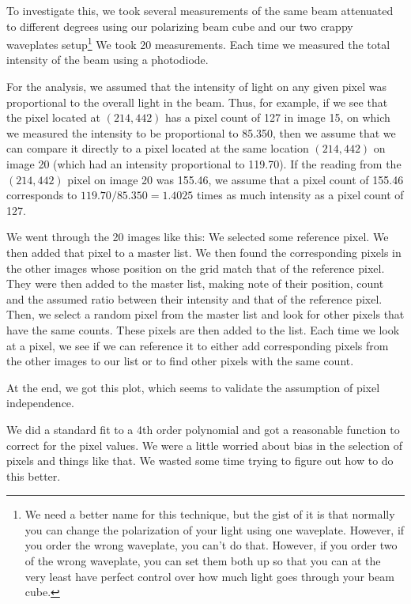 
To investigate this, we took several measurements of the same beam attenuated to different degrees using our polarizing beam cube and our two crappy waveplates setup\footnote{We need a better name for this technique, but the gist of it is that normally you can change the polarization of your light using one waveplate. However, if you order the wrong waveplate, you can't do that. However, if you order two of the wrong waveplate, you can set them both up so that you can at the very least have perfect control over how much light goes through your beam cube. } We took 20 measurements. Each time we measured the total intensity of the beam using a photodiode. 

For the analysis, we assumed that the intensity of light on any given pixel was proportional to the overall light in the beam. Thus, for example, if we see that the pixel located at $(214,442)$ has a pixel count of 127 in image 15, on which we measured the intensity to be proportional to 85.350, then we assume that we can compare it directly to a pixel located at the same location $(214,442)$ on image 20 (which had an intensity proportional to 119.70). If the reading from the $(214,442)$ pixel on image 20 was 155.46, we assume that a pixel count of 155.46 corresponds to $119.70/85.350=1.4025$ times as much intensity as a pixel count of 127. 

We went through the 20 images like this: We selected some reference pixel. We then added that pixel to a master list. We then found the corresponding pixels in the other images whose position on the grid match that of the reference pixel. They were then added to the master list, making note of their position, count and the assumed ratio between their intensity and that of the reference pixel. Then, we select a random pixel from the master list and look for other pixels that have the same counts. These pixels are then added to the list. Each time we look at a pixel, we see if we can reference it to either add corresponding pixels from the other images to our list or to find other pixels with the same count. 

At the end, we got this plot, which seems to validate the assumption of pixel independence.

We did a standard fit to a 4th order polynomial and got a reasonable function to correct for the pixel values. We were a little worried about bias in the selection of pixels and things like that. We wasted some time trying to figure out how to do this better. 

